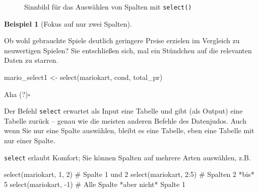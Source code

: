 \documentclass[
  letterpaper,
]{scrbook}
\newenvironment{Shaded}{\begin{snugshade}}{\end{snugshade}}
\newcommand{\CommentTok}[1]{\textcolor[rgb]{0.37,0.37,0.37}{#1}}
\newcommand{\DecValTok}[1]{\textcolor[rgb]{0.68,0.00,0.00}{#1}}
\newcommand{\FunctionTok}[1]{\textcolor[rgb]{0.28,0.35,0.67}{#1}}
\newcommand{\NormalTok}[1]{\textcolor[rgb]{0.00,0.23,0.31}{#1}}
\newcommand{\OtherTok}[1]{\textcolor[rgb]{0.00,0.23,0.31}{#1}}
\newcommand{\SpecialCharTok}[1]{\textcolor[rgb]{0.37,0.37,0.37}{#1}}
\theoremstyle{definition}
\newtheorem{example}{Beispiel}[chapter]
\theoremstyle{definition}
\theoremstyle{definition}
\theoremstyle{remark}
\begin{document}
\begin{figure}


\caption{\label{fig-select}Sinnbild für das Auswählen von Spalten mit
\texttt{select()}}

\end{figure}%

\begin{example}[Fokus auf nur zwei
Spalten]\protect\hypertarget{exm-select}{}\label{exm-select}

Ob wohl gebrauchte Spiele deutlich geringere Preise erzielen im
Vergleich zu neuwertigen Spielen? Sie entschließen sich, mal ein
Stündchen auf die relevanten Daten zu starren.

\begin{Shaded}
\begin{Highlighting}[]
\NormalTok{mario\_select1 }\OtherTok{\textless{}{-}} \FunctionTok{select}\NormalTok{(mariokart, cond, total\_pr)}
\end{Highlighting}
\end{Shaded}

Aha (?)\(\square\)

\end{example}

Der Befehl \texttt{select} erwartet als Input eine Tabelle und gibt (als
Output) eine Tabelle zurück -- genau wie die meisten anderen Befehle des
Datenjudos. Auch wenn Sie nur eine Spalte auswählen, bleibt es eine
Tabelle, eben eine Tabelle mit nur einer Spalte.

\texttt{select} erlaubt Komfort; Sie können Spalten auf mehrere Arten
auswählen, z.B.

\begin{Shaded}
\begin{Highlighting}[]
\FunctionTok{select}\NormalTok{(mariokart, }\DecValTok{1}\NormalTok{, }\DecValTok{2}\NormalTok{)  }\CommentTok{\# Spalte 1 und 2}
\FunctionTok{select}\NormalTok{(mariokart, }\DecValTok{2}\SpecialCharTok{:}\DecValTok{5}\NormalTok{)  }\CommentTok{\#  Spalten 2 *bis* 5 }
\FunctionTok{select}\NormalTok{(mariokart, }\SpecialCharTok{{-}}\DecValTok{1}\NormalTok{)  }\CommentTok{\# Alle Spalte *aber nicht* Spalte 1}
\end{Highlighting}
\end{Shaded}
\end{document}
